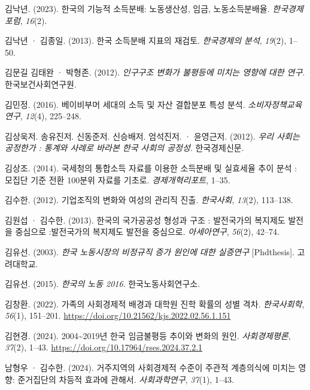 \documentclass[
  letterpaper,
  DIV=11,
  numbers=noendperiod]{scrartcl}
\newlength{\cslhangindent}
\newenvironment{CSLReferences}[2] %
 {\begin{list}{}{%
  \setlength{\itemindent}{0pt}
  \setlength{\leftmargin}{0pt}
  \setlength{\parsep}{0pt}
  \ifodd #1
   \setlength{\leftmargin}{\cslhangindent}
   \setlength{\itemindent}{-1\cslhangindent}
  \fi
  \setlength{\itemsep}{#2\baselineskip}}}
 {\end{list}}
\begin{document}
\begin{CSLReferences}{1}{0}
김낙년. (2023). {한국의 기능적 소득분배: 노동생산성, 임금,
노동소득분배율}. \emph{한국경제포럼}, \emph{16}(2).

김낙년 · 김종일. (2013). {한국 소득분배 지표의 재검토}. \emph{한국경제의
분석}, \emph{19}(2), 1--50.

김문길 김태완 · 박형존. (2012). \emph{{인구구조 변화가 불평등에 미치는
영향에 대한 연구}}. 한국보건사회연구원.

김민정. (2016). {베이비부머 세대의 소득 및 자산 결합분포 특성 분석}.
\emph{소비자정책교육연구}, \emph{12}(4), 225--248.

김상욱저. 송유진저. 신동준저. 신승배저. 엄석진저. · 윤영근저. (2012).
\emph{우리 사회는 공정한가 : 통계와 사례로 바라본 한국 사회의 공정성}.
한국경제신문.

김상조. (2014). {국세청의 통합소득 자료를 이용한 소득분배 및 실효세율
추이 분석 : 모집단 기준 전환 100분위 자료를 기초로}.
\emph{경제개혁리포트}, 1--35.

김수한. (2012). {기업조직의 변화와 여성의 관리직 진출}. \emph{한국사회},
\emph{13}(2), 113--138.

김원섭 · 김수한. (2013). {한국의 국가공공성 형성과 구조 : 발전국가의
복지제도 발전을 중심으로 :발전국가의 복지제도 발전을 중심으로}.
\emph{아세아연구}, \emph{56}(2), 42--74.

김유선. (2003). \emph{한국 노동시장의 비정규직 증가 원인에 대한
실증연구} {[}Phdthesis{]}. 고려대학교.

김유선. (2015). \emph{{한국의 노동 2016}}. 한국노동사회연구소.

김창환. (2022). {가족의 사회경제적 배경과 대학원 진학 확률의 성별 격차}.
\emph{한국사회학}, \emph{56}(1), 151--201.
\url{https://doi.org/10.21562/kjs.2022.02.56.1.151}

김현경. (2024). {2004\textasciitilde2019년 한국 임금불평등 추이와 변화의
원인}. \emph{사회경제평론}, \emph{37}(2), 1--43.
\url{https://doi.org/10.17964/rses.2024.37.2.1}

남형우 · 김수한. (2024). {거주지역의 사회경제적 수준이 주관적 계층의식에
미치는 영향: 준거집단의 차등적 효과에 관해서}. \emph{사회과학연구},
\emph{37}(1), 1--43.


\end{CSLReferences}
\end{document}
